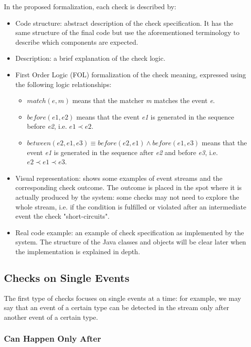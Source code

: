 \documentclass[11pt,a4paper,notitlepage]{article}
\begin{document}
In the proposed formalization, each check is described by:
\begin{itemize}
	\item Code structure: abstract description of the check specification. It has the same structure of the final code but use the aforementioned terminology to describe which components are expected.
	\item Description: a brief explanation of the check logic.
	\item First Order Logic (FOL) formalization of the check meaning, expressed using the following logic relationships:
	\begin{itemize}
		\item $match(e, m)$ means that the matcher \textit{m} matches the event \textit{e}.
		\item $before(e1, e2)$ means that the event \textit{e1} is generated in the sequence before \textit{e2}, i.e. $e1 \prec e2$.
		\item $between(e2, e1, e3) \equiv before(e2, e1) \land before(e1, e3)$ means that the event \textit{e1} is generated in the sequence after \textit{e2} and before \textit{e3}, i.e. $e2 \prec e1 \prec e3$.
	\end{itemize}
	\item Visual representation: shows some examples of event streams and the corresponding check outcome. The outcome is placed in the spot where it is actually produced by the system: some checks may not need to explore the whole stream, i.e. if the condition is fulfilled or violated after an intermediate event the check "short-circuits".
	\item Real code example: an example of check specification as implemented by the system. The structure of the Java classes and objects will be clear later when the implementation is explained in depth.
\end{itemize}


\subsection{Checks on Single Events}

The first type of checks focuses on single events at a time: for example, we may say that an event of a certain type can be detected in the stream only after another event of a certain type.

\subsubsection{Can Happen Only After}
\end{document}
